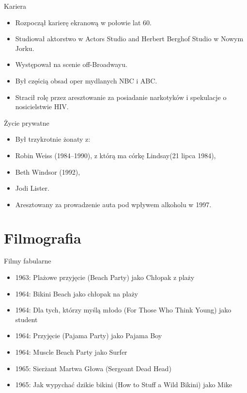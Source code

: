 \documentclass{beamer}
\begin{document}
\begin{frame}{Kariera}
\begin{itemize}
\item<-2> Rozpoczął karierę ekranową w połowie lat 60.
\pause
\item<-2> Studiował aktorstwo w Actors Studio and Herbert Berghof Studio w Nowym Jorku.
\pause
\item Występował na scenie off-Broadwayu\cite{child}.
\item Był częścią obsad oper mydlanych NBC i ABC.
\item Stracił rolę przez aresztowanie za posiadanie narkotyków i spekulacje o nosicielstwie HIV\cite{drug}.
\end{itemize}
\end{frame}

\begin{frame}{Życie prywatne}
\begin{itemize}
\item Był trzykrotnie żonaty z:
\pause
\item Robin Weiss (1984--1990), z którą ma córkę Lindsay(21 lipca 1984),
\pause
\item Beth Windsor (1992)\cite{girl},
\pause
\item Jodi Lister.
\pause
\item Aresztowany za prowadzenie auta pod wpływem alkoholu w 1997\cite{bust}.
\end{itemize}
\end{frame}

\section{Filmografia}
\begin{frame}{Filmy fabularne}
\begin{itemize}
\item 1963: Plażowe przyjęcie (Beach Party) jako Chłopak z plaży
\item 1964: Bikini Beach jako chłopak na plaży
\item 1964: Dla tych, którzy myślą młodo (For Those Who Think Young) jako student
\item 1964: Przyjęcie (Pajama Party) jako Pajama Boy
\item 1964: Muscle Beach Party jako Surfer
\item 1965: Sierżant Martwa Głowa (Sergeant Dead Head)
\item 1965: Jak wypychać dzikie bikini (How to Stuff a Wild Bikini) jako Mike
\end{itemize}
\end{frame}
\end{document}
